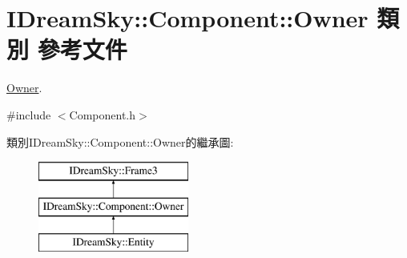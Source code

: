 \hypertarget{class_i_dream_sky_1_1_component_1_1_owner}{}\section{I\+Dream\+Sky\+:\+:Component\+:\+:Owner 類別 參考文件}
\label{class_i_dream_sky_1_1_component_1_1_owner}


\hyperlink{class_i_dream_sky_1_1_component_1_1_owner}{Owner}.  




{\ttfamily \#include $<$Component.\+h$>$}

類別\+I\+Dream\+Sky\+:\+:Component\+:\+:Owner的繼承圖\+:\begin{figure}[H]
\begin{center}
\leavevmode
\includegraphics[height=3.000000cm]{class_i_dream_sky_1_1_component_1_1_owner}
\end{center}
\end{figure}
